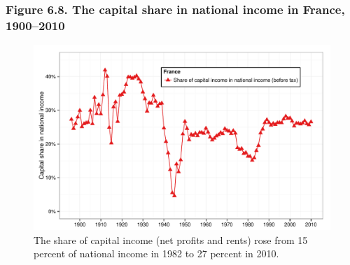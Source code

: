 \documentclass[t]{beamer}\usepackage[]{graphicx}\usepackage[]{color}
\newenvironment{knitrout}{}{} %
\begin{document}
\begin{frame}[label=Figure_6_8]
\frametitle{Figure 6.8. The capital share in national income in France, 1900--2010}
\begin{figure}[t]
\begin{minipage}[b]{\textwidth}
\centering
\begin{knitrout}\footnotesize
{}\color{fgcolor}

{\centering \includegraphics[width=1\linewidth]{figures/color/Figure_6_8} 

}



\end{knitrout}
\caption{The share of capital income (net profits and rents) rose from 15 percent of national income in 1982 to 27 percent in 2010.}
\end{minipage}
\end{figure}
\end{frame}
\end{document}
